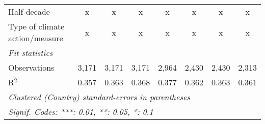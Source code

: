 \begin{tabular}{lccccccc}
   Half decade                                                                       & x            & x            & x             & x             & x              & x              & x\\  
   Type of climate action/measure                                                    & x            & x            & x             & x             & x              & x              & x\\  
   \midrule \emph{Fit statistics}\\
   Observations                                                                      & 3,171        & 3,171        & 3,171         & 2,964         & 2,430          & 2,430          & 2,313\\  
   R$^2$                                                                             & 0.357        & 0.363        & 0.368         & 0.377         & 0.362          & 0.363          & 0.361\\  
   \midrule
   \multicolumn{8}{l}{\emph{Clustered (Country) standard-errors in parentheses}}\\
   \multicolumn{8}{l}{\emph{Signif. Codes: ***: 0.01, **: 0.05, *: 0.1}}\\
\end{tabular}
\par\endgroup


